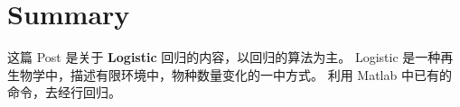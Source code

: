 \section{Summary}
这篇 Post 是关于 \textbf{Logistic} 回归的内容，以回归的算法为主。
Logistic 是一种再生物学中，描述有限环境中，物种数量变化的一中方式。
利用 Matlab 中已有的命令，去经行回归。